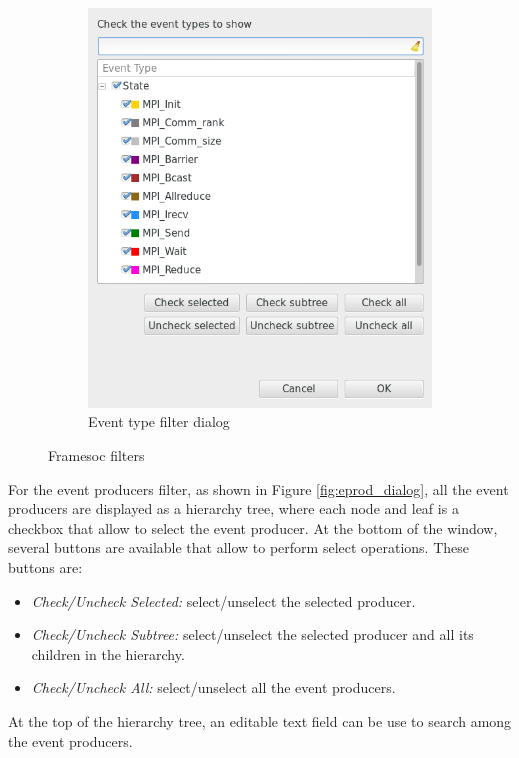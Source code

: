 \documentclass[twoside]{article}
\begin{document}
\begin{sloppypar}
\begin{figure}[h!]
\begin{subfigure}[c]{0.46\textwidth}
    \includegraphics[width=1.0\textwidth]{images/event_filter.png}
    \caption{Event type filter dialog}
    \label{fig:etype_dialog}         
 \end{subfigure}
 \caption{Framesoc filters}
 \label{fig:dbms_configuration}       
\end{figure}

For the event producers filter, as shown in Figure \ref{fig:eprod_dialog}, all the event producers are displayed as a hierarchy tree, where each node and leaf is a checkbox that allow to select the event producer. At the bottom of the window, several buttons are available that allow to perform select operations. These buttons are:
\begin{itemize}
	\item \emph{Check/Uncheck Selected:} select/unselect the selected producer.
	\item \emph{Check/Uncheck Subtree:} select/unselect the selected producer and all its children in the hierarchy.
	\item \emph{Check/Uncheck All:} select/unselect all the event producers. 
\end{itemize}
At the top of the hierarchy tree, an editable text field can be use to search among the event producers.


\end{sloppypar}
\end{document}
